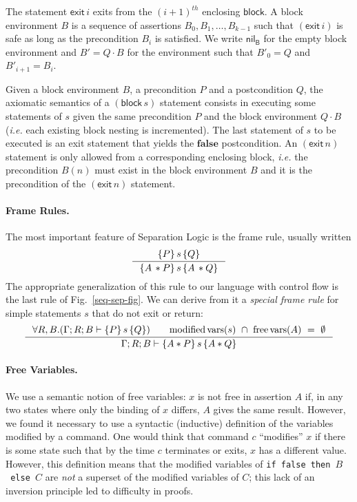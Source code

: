 \documentclass{llncs}
\newcommand{\tyface}[1]{\ensuremath{\mathsf{#1}}}
\newcommand{\Sblock}[1]{\tyface{block}\,#1}
\newcommand{\Sexit}[1]{\tyface{exit}\,#1}
\newcommand{\semax}[6]{#1;#2;#3\vdash \{#4\}#5\{#6\}}
\newcommand{\FF}{\ensuremath{\mathrm{\mathbf{false}}}}
\newcommand{\Bnil}{\tyface{nil}_\tyface{B}}
\newcommand{\Bcons}[2]{#1\cdot #2}
\begin{document}
The statement $\Sexit{i}$ exits from the $(i+1)^{th}$ enclosing
\tyface{block}.
A block environment $B$ is a sequence of assertions
$B_0,B_1,\ldots,B_{k-1}$ such that $(\Sexit{i})$ is safe
as long as the precondition $B_i$ is satisfied.  We
write $\Bnil$ for the empty block environment
and $B'=\Bcons{Q}{B}$ for the environment such that
$B'_0=Q$ and $B'_{i+1}=B_i$.

Given a block environment $B$, a precondition $P$ and a postcondition $Q$,
the axiomatic semantics of a $(\Sblock s)$ statement consists in executing
some statements of
$s$ given the same precondition $P$ and the block environment $\Bcons{Q}{B}$
(\textit{i.e.} each existing block nesting is incremented).
The last statement of $s$ to be executed is an exit statement that yields the
$\FF$ postcondition.
An $(\Sexit n)$ statement is only allowed from a corresponding enclosing block,
\textit{i.e.} the precondition $B(n)$ must exist in the block environment $B$
and it is the precondition of the $(\Sexit n)$ statement.





\paragraph{Frame Rules.}
The most important feature of Separation Logic is the frame rule, usually written
\vspace{-6pt}
\[
\inference{
\{P\}{\,s\,}\{Q\}
}{
\{A\,*P\}{\,s\,}\{A\,*Q\}
}
\] 
The appropriate generalization of this rule to our language with control flow
is the last rule of Fig.~\ref{seq-sep-fig}. 
We can derive from it a \emph{special frame rule}
for simple statements $s$ that
do not exit or return:
\[
\inference{
\forall R,B.(\semax{\Gamma}{R}{B}{P}{\,s\,}{Q})
\qquad
\mathrm{modified\,vars}(s)~\cap~\mathrm{free\,vars}(A)~=~\emptyset
}{
\semax{\Gamma}{R}{B}{A*P}{\,s\,}{A*Q}
}
\]

\paragraph{Free Variables.}
We use a semantic notion of free variables: $x$ is not free in
assertion $A$ if, in any two states where only the binding of $x$
differs, $A$ gives the same result.  However, we found it necessary to
use a syntactic (inductive) definition of the variables modified by a
command.  One would think that command $c$ ``modifies'' $x$ if there
is some state such that by the time $c$ terminates or exits, $x$ has a
different value.  However, this definition means that the modified
variables of \texttt{if~false~then~$B$~else~$C$} are \emph{not} a
superset of the modified variables of $C$; this lack of an inversion
principle led to difficulty in proofs.
\end{document}

